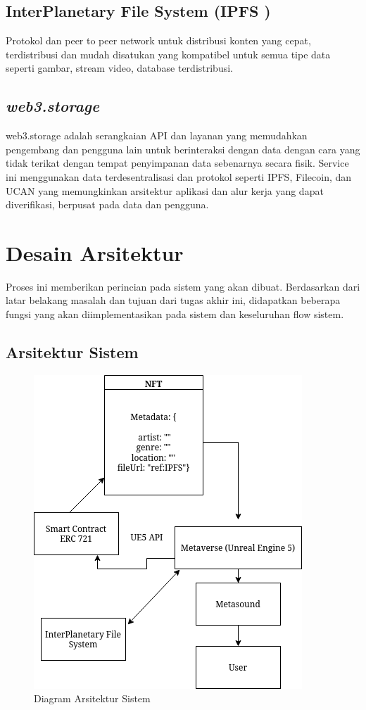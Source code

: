 \subsection{InterPlanetary File System (IPFS )}
Protokol dan peer to
peer network untuk distribusi konten yang cepat, terdistribusi
dan mudah disatukan yang kompatibel untuk semua tipe data
seperti gambar, stream video, database terdistribusi.

\subsection{\emph{web3.storage}}
web3.storage adalah serangkaian API dan layanan yang memudahkan pengembang dan pengguna lain untuk berinteraksi
dengan data dengan cara yang tidak terikat dengan tempat penyimpanan data sebenarnya secara fisik. Service ini menggunakan data terdesentralisasi dan protokol
seperti IPFS, Filecoin, dan UCAN yang memungkinkan arsitektur aplikasi dan alur kerja yang dapat diverifikasi, berpusat pada data dan pengguna.

\section{Desain Arsitektur}
Proses ini memberikan perincian pada sistem yang akan dibuat. Berdasarkan dari latar
belakang masalah dan tujuan dari tugas akhir ini, didapatkan beberapa fungsi yang akan
diimplementasikan pada sistem dan keseluruhan flow sistem.

\subsection{Arsitektur Sistem}

\begin{figure} [ht] \centering
  \includegraphics[scale=0.55]{gambar/arsitektur.png}
  \caption{Diagram Arsitektur Sistem}
  \label{fig:Architecture}
\end{figure}

